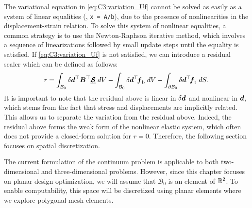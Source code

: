The variational equation in \eqref{eq:C3:variation_Uf} cannot be solved as easily as a system of linear equalities (\eg, \texttt{x = A/b}), due to the presence of nonlinearities in the displacement-strain relation. To solve this system of nonlinear equalities, a common strategy is to use the Newton-Raphson iterative method, which involves a sequence of linearizations followed by small update steps until the equality is satisfied. If \eqref{eq:C3:variation_Uf} is not satisfied, we can introduce a residual scaler which can be defined as follows:
%
\begin{equation}
r = \int_{\mathcal{B}_0} \delta {\boldsymbol{d}}^\top {\boldsymbol{B}}^\top \underline{\boldsymbol{\mathcal{S}}}\; dV - \int_{\mathcal{B}_0}  \delta {\boldsymbol{d}}^\top \! {\boldsymbol{f}}_{\textrm{b}} \; dV - \int_{\partial \mathcal{B}_0}  \delta {\boldsymbol{d}}^\top \! {\boldsymbol{f}}_{\textrm{t}}  \; dS.
\label{eq:C3:residual_scalar}
\end{equation}
%
It is important to note that the residual above is linear in $\delta {\boldsymbol{d}}$ and nonlinear in ${\boldsymbol{d}}$, which stems from the fact that stress and displacements are implicitly related. This allows us to separate the variation from the residual above. Indeed, the residual above forms the weak form of the nonlinear elastic system, which often does not provide a closed-form solution for $r = 0$. Therefore, the following section focuses on spatial discretization.

\begin{rmk}
The current formulation of the continuum problem is applicable to both two-dimensional and three-dimensional problems. However, since this chapter focuses on planar design optimization, we will assume that $\mathcal{B}_0$ is an element of $\mathbb{R}^2$. To enable computability, this space will be discretized using planar elements where we explore polygonal mesh elements.
\end{rmk}




